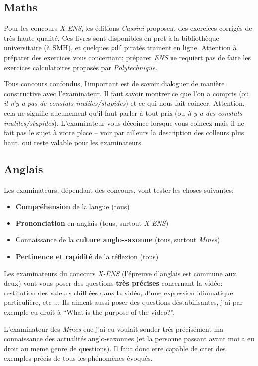 \documentclass{article}
\begin{document}
\subsection{Maths}
Pour les concours \textit{X-ENS}, les éditions \textit{Cassini} proposent des exercices corrigés de très haute qualité.
Ces livres sont disponibles en pret à la bibliothèque universitaire (à SMH), et quelques \texttt{pdf} piratés trainent en ligne.
Attention à préparer des exercices vous concernant: préparer \textit{ENS} ne requiert pas de faire les exercices calculatoires proposés par \textit{Polytechnique}.

Tous concours confondus, l'important est de savoir dialoguer de manière constructive avec l'examinateur.
Il faut savoir montrer ce que l'on a compris (ou \textit{il n'y a pas de constats inutiles/stupides}) et ce qui nous fait coincer.
Attention, cela ne signifie aucunement qu'il faut parler à tout prix (ou \textit{il y a des constats inutiles/stupides}).
L'examinateur vous décoince lorsque vous coincez mais il ne fait pas le sujet à votre place -- voir par ailleurs la description des colleurs plus haut, qui reste valable pour les examinateurs.

\subsection{Anglais}
Les examinateurs, dépendant des concours, vont tester les choses suivantes:


\begin{itemize}
\item  \textbf{Compréhension} de la langue (tous)
\item  \textbf{Prononciation} en anglais (tous, surtout \textit{X-ENS})
\item  Connaissance de la \textbf{culture anglo-saxonne} (tous, surtout \textit{Mines})
\item  \textbf{Pertinence et rapidité} de la réflexion (tous)

\end{itemize}

Les examinateurs du concours \textit{X-ENS} (l'épreuve d'anglais est commune aux deux) vont vous poser des questions \textbf{très précises} concernant la vidéo: restitution des valeurs chiffrées dans la vidéo, d'une expression idiomatique particulière, etc ...
Ils aiment aussi poser des questions déstabilisantes, j'ai par exemple eu droit à ``What is the purpose of the video?''.

L'examinateur des \textit{Mines} que j'ai eu voulait sonder très précisément ma connaissance des actualités anglo-saxonnes (et la personne passant avant moi a eu droit au meme genre de questions).
Il faut donc etre capable de citer des exemples précis de tous les phénomènes évoqués.
\end{document}
